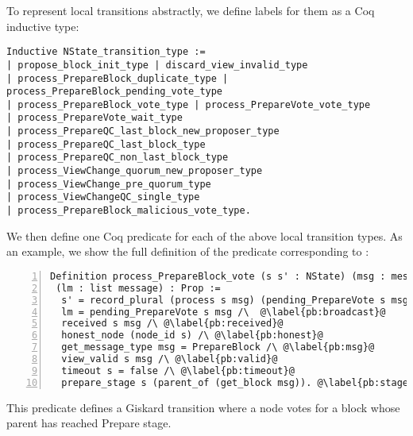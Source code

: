 \documentclass{easychair}
\begin{document}
To represent local transitions abstractly, we define labels for them as a Coq inductive type:
\begin{lstlisting}[language=Coq]
Inductive NState_transition_type := 
| propose_block_init_type | discard_view_invalid_type
| process_PrepareBlock_duplicate_type | process_PrepareBlock_pending_vote_type
| process_PrepareBlock_vote_type | process_PrepareVote_vote_type
| process_PrepareVote_wait_type
| process_PrepareQC_last_block_new_proposer_type
| process_PrepareQC_last_block_type 
| process_PrepareQC_non_last_block_type
| process_ViewChange_quorum_new_proposer_type
| process_ViewChange_pre_quorum_type 
| process_ViewChangeQC_single_type
| process_PrepareBlock_malicious_vote_type.
\end{lstlisting}
We then define one Coq predicate for each of the above local transition types. As an example, we show the full definition of the predicate corresponding to :
\begin{lstlisting}[language=Coq,numbers=left,numberstyle=\footnotesize,escapechar=@]
Definition process_PrepareBlock_vote (s s' : NState) (msg : message) 
 (lm : list message) : Prop :=
  s' = record_plural (process s msg) (pending_PrepareVote s msg) /\ @\label{pb:post-state}@
  lm = pending_PrepareVote s msg /\  @\label{pb:broadcast}@
  received s msg /\ @\label{pb:received}@
  honest_node (node_id s) /\ @\label{pb:honest}@
  get_message_type msg = PrepareBlock /\ @\label{pb:msg}@
  view_valid s msg /\ @\label{pb:valid}@
  timeout s = false /\ @\label{pb:timeout}@
  prepare_stage s (parent_of (get_block msg)). @\label{pb:stage}@
\end{lstlisting}
This predicate defines a Giskard transition where a node votes for a block whose parent has reached Prepare stage.
\end{document}
